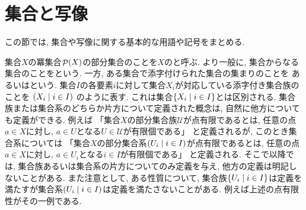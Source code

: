 \documentclass[uplatex, dvipdfmx, a4paper, 12pt, class=jsbook, crop=false]{standalone}
\begin{document}
\section{集合と写像}
\label{sec:sets-and-maps}

この節では, 集合や写像に関する基本的な用語や記号をまとめる.

集合$X$の冪集合$\mathop{\mathcal{P}}\nolimits(X)$の部分集合のことを$X$のと呼ぶ.
より一般に, 集合からなる集合のことをという.
一方, ある集合で添字付けられた集合の集まりのことを
あるいはという.
集合$I$の各要素$i$に対して集合$X_i$が対応している添字付き集合族のことを
\(\setfamily{X_i}{i \in I}\)
のように表す.
これは集合$\setcomp{X_i}{i \in I}$とは区別される.
集合族または集合系のどちらか片方について定義された概念は,
自然に他方についても定義ができる.
例えば
「集合$X$の部分集合族$\mathscr{U}$が点有限であるとは, 任意の点$a \in X$に対し, $a \in U$となる$U \in \mathscr{U}$が有限個である」
と定義されるが, このとき集合系については
「集合$X$の部分集合系$\setfamily{U_i}{i \in I}$が点有限であるとは, 任意の点$a \in X$に対し, $a \in U_i$となる$i \in I$が有限個である」
と定義される.
そこで以降では, 集合族あるいは集合系の片方についてのみ定義を与え, 他方の定義は明記しないことがある.
また注意として, ある性質について, 集合族$\setcomp{U_i}{i \in I}$は定義を満たすが集合系$\setfamily{U_i}{i \in I}$は定義を満たさないことがある.
例えば上述の点有限性がその一例である.
\end{document}
